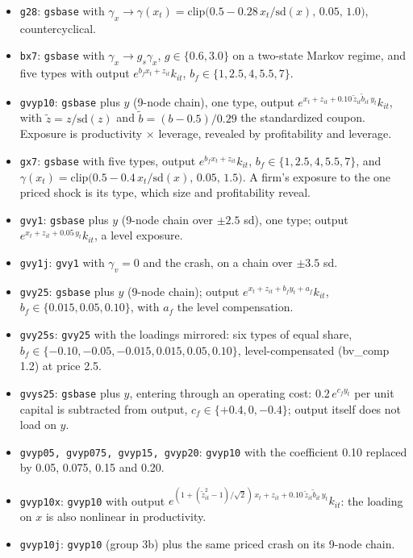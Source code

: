\documentclass[11pt]{article}
\begin{document}
\begin{itemize}
\item \texttt{g28}: \texttt{gsbase} with $\gamma_x\to\gamma(x_t)=\mathrm{clip}\big(0.5-0.28\,x_t/\mathrm{sd}(x),\,0.05,\,1.0\big)$, countercyclical.
\item \texttt{bx7}: \texttt{gsbase} with $\gamma_x\to g_s\gamma_x$, $g\in\{0.6,3.0\}$ on a two-state Markov regime, and five types with output $e^{b_f x_t+z_{it}}k_{it}$, $b_f\in\{1,2.5,4,5.5,7\}$.
\item \texttt{gvyp10}: \texttt{gsbase} plus $y$ (9-node chain), one type, output $e^{x_t+z_{it}+0.10\,\tilde z_{it}\tilde b_{it}\,y_t}k_{it}$, with $\tilde z=z/\mathrm{sd}(z)$ and $\tilde b=(b-0.5)/0.29$ the standardized coupon. Exposure is productivity $\times$ leverage, revealed by profitability and leverage.
\item \texttt{gx7}: \texttt{gsbase} with five types, output $e^{b_f x_t+z_{it}}k_{it}$, $b_f\in\{1,2.5,4,5.5,7\}$, and $\gamma(x_t)=\mathrm{clip}\big(0.5-0.4\,x_t/\mathrm{sd}(x),\,0.05,\,1.5\big)$. A firm's exposure to the one priced shock is its type, which size and profitability reveal.
\item \texttt{gvy1}: \texttt{gsbase} plus $y$ (9-node chain over $\pm2.5$ sd), one type; output $e^{x_t+z_{it}+0.05\,y_t}k_{it}$, a level exposure.
\item \texttt{gvy1j}: \texttt{gvy1} with $\gamma_v=0$ and the crash, on a chain over $\pm3.5$ sd.
\item \texttt{gvy25}: \texttt{gsbase} plus $y$ (9-node chain); output $e^{x_t+z_{it}+b_f y_t+a_f}k_{it}$, $b_f\in\{0.015,0.05,0.10\}$, with $a_f$ the level compensation.
\item \texttt{gvy25s}: \texttt{gvy25} with the loadings mirrored: six types of equal share, $b_f\in\{-0.10,-0.05,-0.015,0.015,0.05,0.10\}$, level-compensated (bv\_comp 1.2) at price 2.5.
\item \texttt{gvys25}: \texttt{gsbase} plus $y$, entering through an operating cost: $0.2\,e^{c_f y_t}$ per unit capital is subtracted from output, $c_f\in\{+0.4,0,-0.4\}$; output itself does not load on $y$.
\item \texttt{gvyp05, gvyp075, gvyp15, gvyp20}: \texttt{gvyp10} with the coefficient 0.10 replaced by 0.05, 0.075, 0.15 and 0.20.
\item \texttt{gvyp10x}: \texttt{gvyp10} with output $e^{(1+(\tilde z_{it}^2-1)/\sqrt2)\,x_t+z_{it}+0.10\,\tilde z_{it}\tilde b_{it}\,y_t}k_{it}$: the loading on $x$ is also nonlinear in productivity.
\item \texttt{gvyp10j}: \texttt{gvyp10} (group 3b) plus the same priced crash on its 9-node chain.

\end{itemize}
\end{document}
